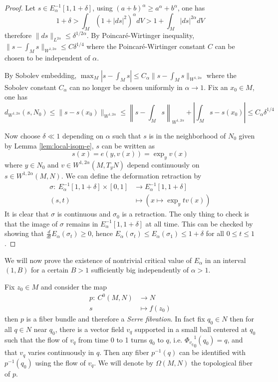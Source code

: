 \begin{proof}
Let \(s\in E_\alpha^{-1}[1, 1+\delta]\), using \((a+b)^\alpha \geq a^\alpha + b^\alpha\), one has
\[
 1 + \delta > \int_M (1+|ds|^2)^\alpha dV > 1 + \int_M |ds|^{2\alpha}dV
\]
therefore \(\|ds\|_{L^{2\alpha}}\leq \delta ^{1/{2\alpha}}\). By Poincaré-Wirtinger
inequality, \(\|s-\int_M s\|_{W^{1,2\alpha}}\leq C \delta^{1/4}\) where the
Poincaré-Wirtinger constant \(C\) can be chosen to be independent of \(\alpha\).

By Sobolev embedding, \(\max_M |s-\int_M s| \leq C_\alpha \|s -\int_M s\|_{W^{1,2\alpha}}\)
where the Sobolev constant \(C_\alpha\) can no longer be chosen uniformly in \(\alpha
\to 1\). Fix an \(x_0\in M\), one has
\[
 d_{W^{1,2\alpha}}(s, N_0) \leq \|s - s(x_0)\|_{W^{1,2\alpha}} \leq \left\|s-\int_M
s\right\|_{W^{1,2\alpha}} + \left|\int_M s - s(x_0)\right| \leq C_\alpha \delta^{1/4}
\]

Now choose \(\delta \ll 1\) depending on \(\alpha\) such that \(s\) is in the
neighborhood of \(N_0\) given by Lemma \ref{lem:local-isom-e}, \(s\) can be written as
\[
 s(x) = e(y,v(x)) = \exp_y v(x)
\]
where \(y\in N_0\) and \(v\in W^{1,2\alpha}(M, T_yN)\) depend continuously on \(s\in
W^{1,2\alpha}(M,N)\). We can define the deformation retraction by
\begin{align*}
  \sigma:\ E^{-1}_\alpha [1,1+\delta]\times [0,1] & \longrightarrow E^{-1}_\alpha[1,1+\delta]\\
  	   		 (s,t)		    	  &\longmapsto \left( x\mapsto \exp_y tv(x)\right)
\end{align*}
It is clear that \(\sigma\) is continuous and \(\sigma_0\) is a retraction. The only
thing to check is that the image of \(\sigma\) remains in \(E_\alpha^{-1}[1,1+\delta]\) at all time. This can be checked by showing that \(\frac{d}{dt}E_\alpha(\sigma_t) \geq
0\), hence \(E_\alpha(\sigma_t) \leq E_\alpha(\sigma_1) \leq 1+\delta\) for all \(0\leq
t\leq 1\).
\end{proof}

We will now prove the existence of nontrivial critical value of \(E_\alpha\) in an
interval \((1, B)\) for a certain \(B>1\) sufficiently big independently of \(\alpha
> 1\).

Fix \(z_0\in M\) and consider the map 
\begin{align*}
  p: \ C^0(M,N) &\longrightarrow N\\
       s	&\longmapsto	 f(z_0)
\end{align*}
then \(p\) is a fiber bundle and therefore a \emph{Serre fibration}. In fact fix \(q_0\in N\) then for all \(q\in N\) near \(q_0\), there is a vector field \(v_q\) supported
in a small ball centered at \(q_0\) such that the flow of \(v_q\) from time 0 to 1
turns \(q_0\) to \(q\), i.e. \({\Phi_{v_q}}_0^1(q_0)=q\), and that \(v_q\) varies continuously
in \(q\). Then any fiber \(p^{-1}(q)\) can be identified with \(p^{-1}(q_0)\) using
the flow of \(v_q\). We will denote by \(\Omega(M,N)\) the topological fiber of \(p\).


